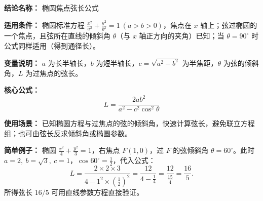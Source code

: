 \textbf{结论名称：} 椭圆焦点弦长公式

\textbf{适用条件：} 椭圆标准方程 \(\frac{x^2}{a^2}+\frac{y^2}{b^2}=1\ (a>b>0)\)，焦点在 \(x\) 轴上；弦过椭圆的一个焦点，且弦所在直线的倾斜角 \(\theta\)（与 \(x\) 轴正方向的夹角）已知；当 \(\theta=90^\circ\) 时公式同样适用（得到通径长）。

\textbf{变量说明：} \(a\) 为长半轴长，\(b\) 为短半轴长，\(c=\sqrt{a^2-b^2}\) 为半焦距，\(\theta\) 为弦的倾斜角，\(L\) 为过焦点的弦长。

\textbf{核心公式：} \[ \boxed{L = \frac{2ab^2}{a^2 - c^2\cos^2\theta}} \]

\textbf{使用场景：} 已知椭圆方程与过焦点的弦的倾斜角，快速计算弦长，避免联立方程组；也可由弦长反求倾斜角或椭圆参数。

\textbf{简单例子：} 椭圆 \(\frac{x^2}{4}+\frac{y^2}{3}=1\)，右焦点 \(F(1,0)\)，过 \(F\) 的弦倾斜角 \(\theta=60^\circ\)。此时 \(a=2,\ b=\sqrt{3},\ c=1\)，\(\cos60^\circ=\frac12\)，代入公式：
\[ L = \frac{2\times 2\times 3}{4 - 1^2\times\left(\frac12\right)^2} = \frac{12}{4-\frac14} = \frac{12}{\frac{15}{4}} = \frac{16}{5}. \]
所得弦长 \(16/5\) 可用直线参数方程直接验证。